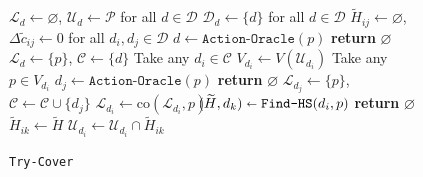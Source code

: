 \begin{figure}
	\vspace{-.7cm}
	\begin{minipage}{0.42\textwidth}
		\begin{algorithm}[H]
			\caption{\texttt{Try-Cover}}\label{alg:try_partition}
			\small
			\begin{algorithmic}[1]
				\State $\mathcal{L}_d \gets \varnothing$, $\mathcal{U}_{d}\leftarrow\mathcal{P}$ for all $d \in \mathcal{D}$\label{line:init_start}
				\State $\mathcal{D}_d\gets \{d\}$ for all $d \in \mathcal{D}$ 
				\State $\widetilde{{H}}_{ij} \gets \varnothing$, $ \Delta \widetilde c_{ij}\gets 0$ for all $d_i,d_j \in \mathcal{D}$
				\State $d\leftarrow\texttt{Action-Oracle}(p)$ \Comment{\textcolor{gray}{For any $p$ %
				}}
				{\textbf{return} $\varnothing$}\label{line:rollback_1}
				\State $\mathcal{L}_{d}\leftarrow\{p\}$, $\mathcal{C} \gets \{ d \}$\label{line:init_end}
				\label{line:partition_loop1}
				\State Take any $d_i \in \mathcal{C}$
				\label{line:partition_loop2}
				\State $V_{d_i} \gets V(\mathcal{U}_{d_i})$ \label{line:loop_vertex}
				\Do 
				\State Take any $p \in V_{d_i}$
				\State $d_j \leftarrow \texttt{Action-Oracle}(p)$\label{line:d_j}
				{\textbf{return} $\varnothing$}\label{line:rollback_3}
				 \label{line:add_1}
				\State $\mathcal{L}_{d_j} \gets \{ p \}$, $\mathcal{C} \gets \mathcal{C} \cup \{d_j\}$\label{line:add_2}
				\EndIf
				\State $\mathcal{L}_{d_i} \gets \text{co}(\mathcal{L}_{d_i}, p)$
				\Else
				\State $\hspace{-3.5mm}(\widetilde H, d_k) \shortleftarrow \texttt{Find-HS} ({d_i},p)$\label{line:find_hp}\label{line:d_k}
				{\textbf{return} $\varnothing$}\label{line:rollback_2}
				\State $\widetilde H_{ik} \gets \widetilde H$\label{line:switch}
				\State $\mathcal{U}_{d_i} \leftarrow \mathcal{U}_{d_i} \cap \widetilde H_{ik} $\label{line:upper_bounds}

\end{algorithmic}
\end{algorithm}
\end{minipage}
\end{figure}

